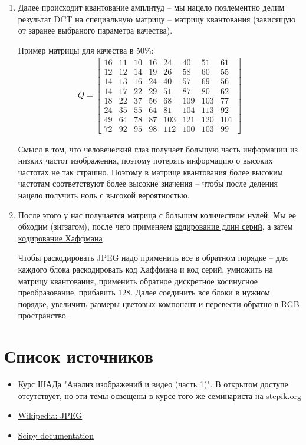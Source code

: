 \documentclass[]{book}
\theoremstyle{definition}
\begin{document}
\begin{enumerate}
    \item Далее происходит квантование амплитуд -- мы нацело поэлементно делим результат DCT на специальную матрицу -- матрицу квантования (зависящую от заранее выбраного параметра качества).
    
    Пример матрицы для качества в 50\%:
    \begin{gather*}
        Q={\begin{bmatrix}16&11&10&16&24&40&51&61\\12&12&14&19&26&58&60&55\\14&13&16&24&40&57&69&56\\14&17&22&29&51&87&80&62\\18&22&37&56&68&109&103&77\\24&35&55&64&81&104&113&92\\49&64&78&87&103&121&120&101\\72&92&95&98&112&100&103&99\end{bmatrix}}    
    \end{gather*}
    
    Смысл в том, что человеческий глаз получает большую часть информации из низких частот изображения, поэтому потерять информацию о высоких частотах не так страшно. Поэтому в матрице квантования более высоким частотам соответствуют более высокие значения -- чтобы после деления нацело получить ноль с высокой вероятностью.
    
    \item После этого у нас получается матрица с большим количеством нулей. Мы ее обходим (зигзагом), после чего применяем \href{https://ru.wikipedia.org/wiki/Кодирование_длин_серий}{кодирование длин серий}, а затем \href{https://ru.wikipedia.org/wiki/Код_Хаффмана}{кодирование Хаффмана}
    
Чтобы раскодировать JPEG надо применить все в обратном порядке -- для каждого блока раскодировать код Хаффмана и код серий, умножить на матрицу квантования, применить обратное дискретное косинусное преобразование, прибавить 128. Далее соединить все блоки в нужном порядке, увеличить размеры цветовых компонент и перевести обратно в RGB пространство.
    
\end{enumerate}

\section*{Список источников}

\begin{itemize}
    \item Курс ШАДа "Анализ изображений и видео (часть 1)". В открытом доступе отсутствует, но эти темы освещены в курсе \href{https://stepik.org/course/1280}{того же семинариста на stepik.org}
    \item \href{https://en.wikipedia.org/wiki/JPEG}{Wikipedia: JPEG}
    \item \href{https://docs.scipy.org/doc/}{Scipy documentation}
\end{itemize}
\end{document}
